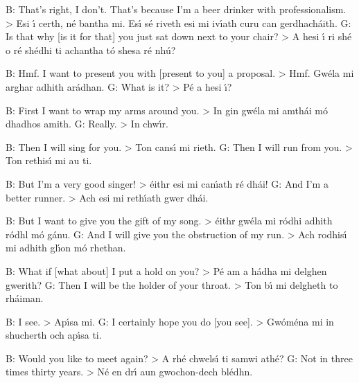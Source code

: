 B: That's right, I don't. That's because I'm a beer drinker with professionalism. > Esi \'{\i} certh, n\'{e} bantha mi. Es\'{\i} s\'{e} riveth esi mi iv\'{\i}ath curu can gerdhach\'{a}ith.
G: Is that why [is it for that] you just sat down next to your chair? > A hesi \'{\i} ri sh\'{e} o r\'{e} sh\'{e}dhi ti achantha t\'{o} shesa r\'{e} nh\'{u}?

B: Hmf. I want to present you with [present to you] a proposal. > Hmf. Gw\'{e}la mi arghar adhith ar\'{a}dhan.
G: What is it? > P\'{e} a hesi \'{\i}?

B: First I want to wrap my arms around you. > In gin gw\'{e}la mi amth\'{a}i m\'{o} dhadhos amith.
G: Really. > In chw\'{\i}r.

B: Then I will sing for you. > Ton cans\'{\i} mi rieth.
G: Then I will run from you. > Ton rethis\'{\i} mi au ti.

B: But I'm a very good singer! > \'{e}ithr esi mi can\'{\i}ath r\'{e} dh\'{a}i!
G: And I'm a better runner. > Ach esi mi reth\'{\i}ath gwer dh\'{a}i.

B: But I want to give you the gift of my song. > \'{e}ithr gw\'{e}la mi r\'{o}dhi adhith r\'{o}dhl m\'{o} g\'{a}nu.
G: And I will give you the obstruction of my run. > Ach rodhis\'{\i} mi adhith gl\'{\i}on m\'{o} rhethan.

B: What if [what about] I put a hold on you? > P\'{e} am a h\'{a}dha mi delghen gwerith?
G: Then I will be the holder of your throat. > Ton b\'{\i} mi delgheth to rh\'{a}iman.

B: I see. > Ap\'{\i}sa mi.
G: I certainly hope you do [you see]. > Gw\'{o}m\'{e}na mi in shucherth och ap\'{\i}sa ti.

B: Would you like to meet again? > A rh\'{e} chwels\'{\i} ti samwi ath\'{e}?
G: Not in three times thirty years. > N\'{e} en dr\'{\i} aun gwochon-dech bl\'{e}dhn.
